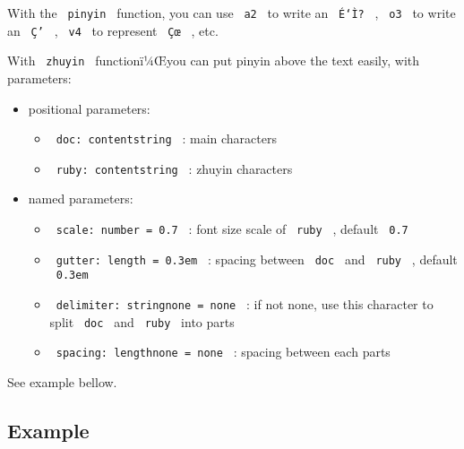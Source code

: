 With the \texttt{\ pinyin\ } function, you can use \texttt{\ a2\ } to
write an \texttt{\ É‘Ì?\ } , \texttt{\ o3\ } to write an \texttt{\ Ç’\ }
, \texttt{\ v4\ } to represent \texttt{\ Çœ\ } , etc.

With \texttt{\ zhuyin\ } functionï¼Œyou can put pinyin above the text
easily, with parameters:

\begin{itemize}
\tightlist
\item
  positional parameters:

  \begin{itemize}
  \tightlist
  \item
    \texttt{\ doc:\ content\textbar{}string\ } : main characters
  \item
    \texttt{\ ruby:\ content\textbar{}string\ } : zhuyin characters
  \end{itemize}
\item
  named parameters:

  \begin{itemize}
  \tightlist
  \item
    \texttt{\ scale:\ number\ =\ 0.7\ } : font size scale of
    \texttt{\ ruby\ } , default \texttt{\ 0.7\ }
  \item
    \texttt{\ gutter:\ length\ =\ 0.3em\ } : spacing between
    \texttt{\ doc\ } and \texttt{\ ruby\ } , default \texttt{\ 0.3em\ }
  \item
    \texttt{\ delimiter:\ string\textbar{}none\ =\ none\ } : if not
    none, use this character to split \texttt{\ doc\ } and
    \texttt{\ ruby\ } into parts
  \item
    \texttt{\ spacing:\ length\textbar{}none\ =\ none\ } : spacing
    between each parts
  \end{itemize}
\end{itemize}

See example bellow.

\subsection{Example}\label{example}

